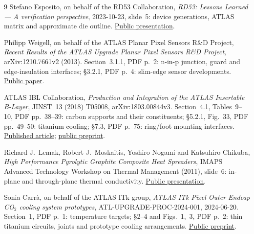 \begingroup
\renewcommand{\bibname}{Pixel detector references}
\renewcommand{\chapter}[2][]{\subsection*{Pixel detector references}}
\small\raggedright
\begin{thebibliography}{9}
 Stefano Esposito, on behalf of the RD53 Collaboration,
\emph{RD53: Lessons Learned --- A verification perspective},
2023-10-23, slide~5: device generations, ATLAS matrix and approximate die
outline. \href{https://indico.cern.ch/event/1335413/contributions/5621748/attachments/2731411/4764279/RD53\%20Lessons\%20Learned\%20in\%20Verification.pdf}{Public presentation}.

 Philipp Weigell, on behalf of the ATLAS Planar Pixel Sensors R\&D
Project, \emph{Recent Results of the ATLAS Upgrade Planar Pixel Sensors R\&D
Project}, arXiv:1210.7661v2 (2013). Section~3.1.1, PDF p.~2: n-in-p junction,
guard and edge-insulation interfaces; \S3.2.1, PDF p.~4: slim-edge sensor
developments. \href{https://cds.cern.ch/record/1491076/files/1210.7661.pdf}{Public paper}.

 ATLAS IBL Collaboration, \emph{Production and Integration of the
ATLAS Insertable B-Layer}, JINST~13 (2018) T05008, arXiv:1803.00844v3.
Section~4.1, Tables~9--10, PDF pp.~38--39: carbon supports and their constituents;
\S5.2.1, Fig.~33, PDF pp.~49--50: titanium cooling;
\S7.3, PDF p.~75: ring/foot mounting interfaces.
\href{https://doi.org/10.1088/1748-0221/13/05/T05008}{Published article};
\href{https://arxiv.org/abs/1803.00844}{public preprint}.

 Richard J.~Lemak, Robert J.~Moskaitis, Yoshiro Nogami and
Katsuhiro Chikuba, \emph{High Performance Pyrolytic Graphite Composite Heat
Spreaders}, IMAPS Advanced Technology Workshop on Thermal Management (2011),
slide~6: in-plane and through-plane thermal conductivity.
\href{https://www.mineralstech.com/docs/default-source/refractories-documents/pyrogenics/pyroid/high-performance-pyrolytic-graphite-composite-heat-spreaders.pdf?sfvrsn=50359b20_2}{Public presentation}.

 Sonia Carr\`a, on behalf of the ATLAS ITk group,
\emph{ATLAS ITk Pixel Outer Endcap CO$_2$ cooling system prototypes},
ATL-UPGRADE-PROC-2024-001, 2024-06-20. Section~1, PDF p.~1: temperature targets;
\S2--4 and Figs.~1,~3, PDF p.~2: thin titanium circuits, joints and prototype
cooling arrangements.
\href{https://cds.cern.ch/record/2901596/files/ATL-UPGRADE-PROC-2024-001.pdf}{Public preprint}.


\end{thebibliography}
